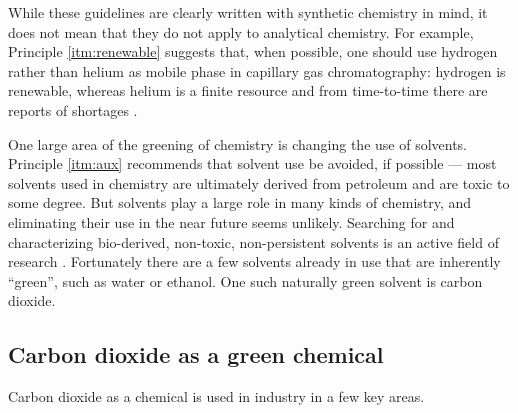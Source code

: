 While these guidelines are clearly written with synthetic chemistry in mind, it
does not mean that they do not apply to analytical chemistry. For example,
Principle \ref{itm:renewable} suggests that, when possible, one should use
hydrogen rather than helium as mobile phase in capillary gas chromatography:
hydrogen is renewable, whereas helium is a finite resource and from time-to-time
there are reports of shortages \autocite{Kornblut2019}.

One large area of the greening of chemistry is changing the use of solvents.
Principle \ref{itm:aux} recommends that solvent use be avoided, if possible ---
most solvents used in chemistry are ultimately derived from petroleum and are
toxic to some degree. But solvents play a large role in many kinds of chemistry,
and eliminating their use in the near future seems unlikely. Searching for and
characterizing bio-derived, non-toxic, non-persistent solvents is an active
field of research \autocite{Clarke2018}. Fortunately there are a few solvents
already in use that are inherently ``green'', such as water or ethanol. One such
naturally green solvent is carbon dioxide.
 

\subsection{Carbon dioxide as a green chemical}

Carbon dioxide as a chemical is used in industry in a few key areas.

